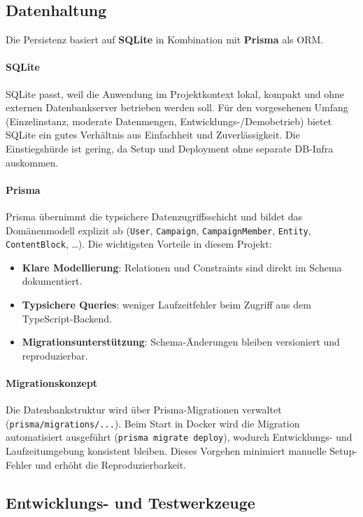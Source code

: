 \subsection{Datenhaltung}

Die Persistenz basiert auf \textbf{SQLite} in Kombination mit \textbf{Prisma}
als ORM.

\paragraph{SQLite}
SQLite passt, weil die Anwendung im Projektkontext lokal, kompakt und
ohne externen Datenbankserver betrieben werden soll.
Für den vorgesehenen Umfang (Einzelinstanz, moderate Datenmengen,
Entwicklungs-/Demobetrieb) bietet SQLite ein gutes Verhältnis aus Einfachheit
und Zuverlässigkeit.
Die Einstiegshürde ist gering, da Setup und Deployment ohne separate DB-Infra
auskommen.

\paragraph{Prisma}
Prisma übernimmt die typsichere Datenzugriffsschicht und bildet das
Domänenmodell explizit ab
(\texttt{User}, \texttt{Campaign}, \texttt{CampaignMember}, \texttt{Entity},
\texttt{ContentBlock}, \dots).
Die wichtigsten Vorteile in diesem Projekt:
\begin{itemize}
  \item \textbf{Klare Modellierung}: Relationen und Constraints sind direkt im
  Schema dokumentiert.
  \item \textbf{Typsichere Queries}: weniger Laufzeitfehler beim Zugriff aus
  dem TypeScript-Backend.
  \item \textbf{Migrationsunterstützung}: Schema-Änderungen bleiben versioniert
  und reproduzierbar.
\end{itemize}

\paragraph{Migrationskonzept}
Die Datenbankstruktur wird über Prisma-Migrationen verwaltet
(\texttt{prisma/migrations/...}).
Beim Start in Docker wird die Migration automatisiert ausgeführt
(\texttt{prisma migrate deploy}), wodurch Entwicklungs- und Laufzeitumgebung
konsistent bleiben.
Dieses Vorgehen minimiert manuelle Setup-Fehler und erhöht die Reproduzierbarkeit.

\subsection{Entwicklungs- und Testwerkzeuge}

